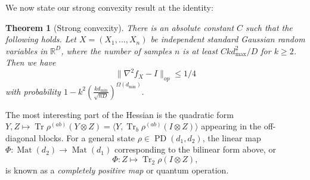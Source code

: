 \documentclass[aos]{imsart}
\newtheorem{theorem}{Theorem}[section]
\theoremstyle{definition}
\numberwithin{equation}{section}
\DeclareMathOperator{\poly}{poly}
\DeclareMathOperator{\mat}{Mat}
\DeclareMathOperator{\tr}{Tr}
\DeclareMathOperator{\PD}{PD}
\DeclarePairedDelimiter{\norm}{\lVert}{\rVert}
\newcommand{\R}{{\mathbb{R}}}
\newcommand{\ot}{\otimes}
\newcommand{\eps}{\varepsilon}
\newcommand{\samp}{x}
\newcommand{\rv}{X}
\newcommand{\CF}[1]{{\color{purple}[CF: #1]}}
\newcommand{\MW}[1]{{\color{red}[MW: #1]}}
\newcommand{\TODO}[1]{{\color{blue}[TODO: #1]}}
\begin{document}







We now state our strong convexity result at the identity:


\begin{theorem}[Strong convexity]\label{thm:tensor-convexity} There is an absolute constant $C$ such that the following holds. Let $\rv = (\rv_1,\dots,\rv_n)$ be independent standard Gaussian random variables in $\R^D$, where the number of samples $n$ is at least $C k d_{\max}^2/D$ for $k \geq 2$. Then we have
$$ \|\nabla^{2} f_{\rv} - I\|_{op} \leq 1/4$$
with probability $1 - k^2 \left(\frac {kd_{\min}}{\sqrt{nD}}\right)^{ \Omega(d_{\min})}.$
\end{theorem}



The most interesting part of the Hessian is the quadratic form $Y,Z \mapsto \tr \rho^{(ab)} \left( Y \ot Z \right) = \langle Y, \tr_b \rho^{(ab)} \left(I \ot Z\right) \rangle$ appearing in the off-diagonal blocks. For a general state $\rho \in \PD(d_1, d_2)$, the linear map $\Phi:\mat(d_2) \to \mat(d_1)$ corresponding to the bilinear form above, or
$$\Phi: Z \mapsto \tr_2 \rho \left(I \ot Z\right),$$
 is known as a \emph{completely positive map} or quantum operation. 
 
\end{document}
